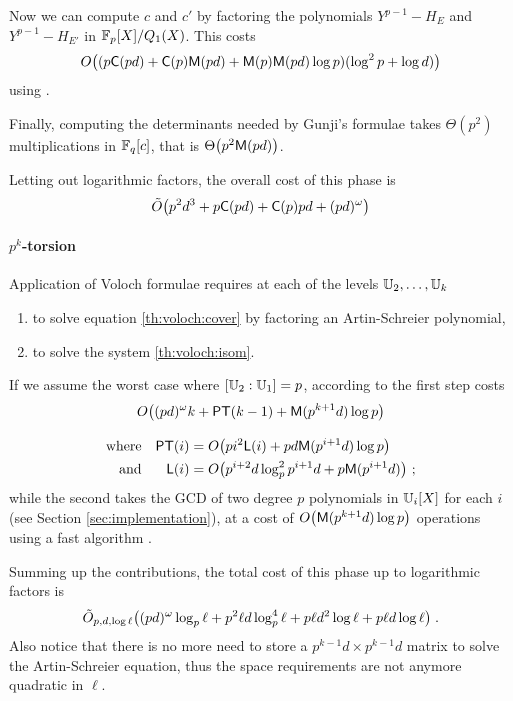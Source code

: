 Now we can compute $c$ and $c'$ by factoring the polynomials
$Y^{p-1}-H_E$ and $Y^{p-1}-H_{E'}$ in $\mathbb{F}_p[X]/Q_1(X)$. This costs
\[O\bigl((p\mathrm{\sf C}(pd) + \mathrm{\sf C}(p)\mathrm{\sf M}(pd) + \mathrm{\sf M}(p)\mathrm{\sf M}(pd)\log
p)(\log^2 p+\log d)\bigr)\]
using \cite[Section 3]{KS97}.

Finally, computing the determinants needed by Gunji's formulae takes
$\Theta(p^2)$ multiplications in $\mathbb{F}_q[c]$, that is
$\Theta\bigl(p^2\mathrm{\sf M}(pd)\bigr)$.

Letting out logarithmic factors, the overall cost of this phase is
\begin{equation}
  \label{eq:gunji-complexity}
  \tilde{O}\bigl(p^2d^3 + p\mathrm{\sf C}(pd) + \mathrm{\sf C}(p)pd + (pd)^\omega \bigr)
\end{equation}


\paragraph{$p^k$-torsion}
Application of Voloch formulae requires at each of the levels
$\mathbb{U}_2,\ldots,\mathbb{U}_k$
\begin{enumerate}
\item to solve equation \eqref{th:voloch:cover} by factoring an
  Artin-Schreier polynomial,
\item to solve the system \eqref{th:voloch:isom}.
\end{enumerate}
If we assume the worst case where $[\mathbb{U}_2:\mathbb{U}_1] = p$, according to
\cite[Th. 13]{DFS09} the first step costs
\begin{gather*}
  O\bigl((pd)^\omega k + {\sf PT}(k-1) + \mathrm{\sf M}(p^{k+1}d)\log p\bigr)\\[0.3cm]
  \begin{aligned}
    \text{where}&&
    {\sf PT}(i) &= O\bigl(pi^2{\sf L}(i) + pd\mathrm{\sf M}(p^{i+1}d)\log p\bigr)\\
    \text{and}&&
    {\sf L}(i) &= O\bigl(p^{i+2}d\log_p^2{p^{i+1}d} + p\mathrm{\sf M}(p^{i+1}d)\bigr)
    \text{ ;}
  \end{aligned}
\end{gather*}
while the second takes the GCD of two degree $p$ polynomials in
$\mathbb{U}_i[X]$ for each $i$ (see Section \ref{sec:implementation}), at a
cost of $O\bigl(\mathrm{\sf M}(p^{k+1}d)\log p\bigr)$ operations using a fast
algorithm \cite[$\S$11.1]{vzGG}.

Summing up the contributions, the total cost of this phase up to
logarithmic factors is
\begin{equation}
  \label{eq:C2-AS:complexity:p^k}
  \tilde{O}_{p,d,\log\ell}\bigl((pd)^\omega \log_p\ell + p^2\ell d\log_p^4\ell +
  p\ell d^2\log\ell + p\ell d\log\ell\bigr)
  \;\text{.}  
\end{equation}
Also notice that there is no more need to store a $p^{k-1}d\times
p^{k-1}d$ matrix to solve the Artin-Schreier equation, thus the space
requirements are not anymore quadratic in $\ell$.


